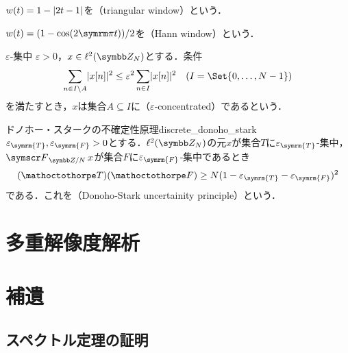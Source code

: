 \documentclass[../../main]{subfiles}
\begin{document}
\begin{example}
  \(w(t)=1-\lvert2t-1\rvert\)を（triangular window）という．
\end{example}

\begin{example}
  \(w(t)=(1-\cos(2\krez t))/2\)を（Hann window）という．
\end{example}

\begin{definition}{\(\varepsilon\)‐集中}{}
  \(\varepsilon>0\)，\(x\in\cycles{N}\)とする．条件
  \[
    \sum_{n\in I\setminus A}\abs{x[n]}^2 \leq \varepsilon^2\sum_{n\in I}\abs{x[n]}^2\quad(I=\Set{0,\dots,N-1})
  \]
  を満たすとき，\(x\)は集合\(A\subseteq I\)に（\(\varepsilon\)‐concentrated）であるという．
\end{definition}

\begin{theorem}{ドノホー・スタークの不確定性原理}{discrete_donoho_stark}
  \(\varepsilon_{\symrm{T}},\varepsilon_{\symrm{F}}>0\)とする．\(\cycles{N}\)の元\(x\)が集合\(T\)に\(\varepsilon_{\symrm{T}}\)‐集中，\(\dft{N}x\)が集合\(F\)に\(\varepsilon_{\symrm{F}}\)‐集中であるとき
  \[
    (\sizeof{T})(\sizeof{F}) \geq N(1-\varepsilon_{\symrm{T}}-\varepsilon_{\symrm{F}})^2
  \]
  である．これを（Donoho‐Stark uncertainity principle）という．
\end{theorem}

\section{多重解像度解析}
\label{section:discrete_mra}

\section{補遺}

\subsection{スペクトル定理の証明}
\label{subsection:proof_of_the_spectral_theorem}
\end{document}

